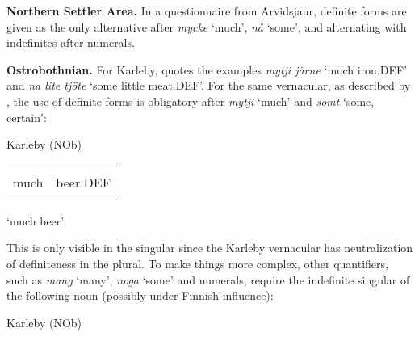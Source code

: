\begin{styleBodytextC}
\textbf{Northern Settler Area. }In a questionnaire from Arvidsjaur, definite forms are given as the only alternative after \textit{mycke} ‘much’, \textit{nå} ‘some’, and alternating with indefinites after numerals.

\end{styleBodytextC}

\begin{styleBodytextC}
\textbf{Ostrobothnian.} For Karleby, \citet[94]{Hagfors1891} quotes the examples \textit{mytji järne} ‘much iron.DEF’ and \textit{na lite tjöte} ‘some little meat.DEF’. For the same vernacular, as described by \citet{Vangsnes2003}, the use of definite forms is obligatory after \textit{mytji} ‘much’ and \textit{somt} ‘some, certain’:

\end{styleBodytextC}

\begin{listWWNumileveli}
\item {}

\begin{styleExample}
Karleby (NOb)

\end{styleExample}

\end{listWWNumileveli}

\begin{tabular}{ll}
\lsptoprule
\multicolumn{2}{l}{mytji

}\\
much & beer.DEF\\
\lspbottomrule
\end{tabular}

\begin{styleTranslation}
‘much beer’

\end{styleTranslation}

\begin{styleBodyTextFirst}
This is only visible in the singular since the Karleby vernacular has neutralization of definiteness in the plural. To make things more complex, other quantifiers, such as \textit{mang} ‘many’, \textit{noga} ‘some’ and numerals, require the indefinite singular of the following noun (possibly under Finnish influence):

\end{styleBodyTextFirst}

\begin{listWWNumileveli}
\item {}

\begin{styleExample}
Karleby (NOb)

\end{styleExample}

\end{listWWNumileveli}

